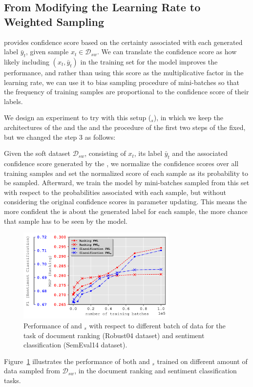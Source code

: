 \subsection{From Modifying the Learning Rate to Weighted Sampling}
\fwl provides confidence score based on the certainty associated with each generated label $\bar{y}_t$, given sample $x_t \in \mathcal{D}_{sw}$. We can translate the confidence score as how likely including $(x_t,\bar{y}_t)$ in the training set for the \std model improves the performance, and rather than using this score as the multiplicative factor in the learning rate, we can use it to bias sampling procedure of mini-batches so that the frequency of training samples are proportional to the confidence score of their labels.

We design an experiment to try \fwl with this setup (\fwlnospace$_s$), in which we keep the architectures of the \std and the \tch and the procedure of the  first two steps of the \fwl fixed, but we changed the step 3 as follows:

Given the soft dataset $\mathcal{D}_{sw}$, consisting of $x_t$, its label $\bar{y}_t$ and the associated confidence score generated by the \tch, we normalize the confidence scores over all training samples and set the normalized score of each sample as its probability to be sampled. 
Afterward, we train the \std model by mini-batches sampled from this set with respect to the probabilities associated with each sample, but without considering the original confidence scores in parameter updating.
This means the more confident the \tch is about the generated label for each sample, the more chance that sample has to be seen by the \std model.
\begin{figure}[t]
    \centering
    \includegraphics[width=0.7\textwidth]{03-part-02/chapter-05/figs_and_tables/plot_sampling_fwl.png}
    \caption{Performance of \fwl and \fwlnospace$_s$ with respect to different batch of data for the task of document ranking (Robust04 dataset) and sentiment classification (SemEval14 dataset).}
    \label{fig:sampling}
\end{figure}
Figure~\ref{fig:sampling} illustrates the performance of both \fwl and \fwlnospace$_s$ trained on different amount of data sampled from $\mathcal{D}_{sw}$, in the document ranking and sentiment classification tasks. 

